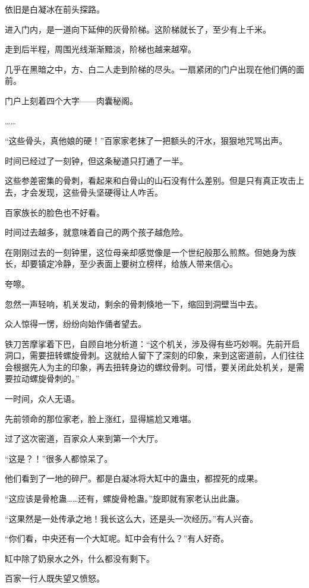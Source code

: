 \begin{this_body}
依旧是白凝冰在前头探路。

进入门内，是一道向下延伸的灰骨阶梯。这阶梯就长了，至少有上千米。

走到后半程，周围光线渐渐黯淡，阶梯也越来越窄。

几乎在黑暗之中，方、白二人走到阶梯的尽头。一扇紧闭的门户出现在他们俩的面前。

门户上刻着四个大字——肉囊秘阁。

……

“这些骨头，真他娘的硬！”百家家老抹了一把额头的汗水，狠狠地咒骂出声。

时间已经过了一刻钟，但这条秘道只打通了一半。

这些参差密集的骨刺，看起来和白骨山的山石没有什么差别。但是只有真正攻击上去，才会发现，这些骨头坚硬得让人咋舌。

百家族长的脸色也不好看。

时间过去越多，就意味着自己的两个孩子越危险。

在刚刚过去的一刻钟里，这位母亲却感觉像是一个世纪般那么煎熬。但她身为族长，却要镇定冷静，至少表面上要树立榜样，给族人带来信心。

夸嚓。

忽然一声轻响，机关发动，剩余的骨刺倏地一下，缩回到洞壁当中去。

众人惊得一愣，纷纷向始作俑者望去。

铁刀苦摩挲着下巴，自顾自地分析道：“这个机关，涉及得有些巧妙啊。先前开启洞口，需要扭转螺旋骨刺。这就给人留下了深刻的印象，来到这密道前，人们往往会根据先人为主的印象，再去扭转身边的螺纹骨刺。可惜，要关闭此处机关，是需要拉动螺旋骨刺的。”

一时间，众人无语。

先前领命的那位家老，脸上涨红，显得尴尬又难堪。

过了这次密道，百家众人来到第一个大厅。

“这是？！”很多人都惊呆了。

他们看到了一地的碎尸。都是白凝冰将大缸中的蛊虫，都捏死的成果。

“这应该是骨枪蛊……还有，螺旋骨枪蛊。”旋即就有家老认出此蛊。

“这果然是一处传承之地！我长这么大，还是头一次经历。”有人兴奋。

“你们看，中央还有一个大缸呢。缸中会有什么？”有人好奇。

缸中除了奶泉水之外，什么都没有剩下。

百家一行人既失望又愤怒。


\end{this_body}
